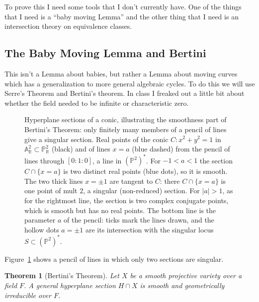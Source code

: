 \documentclass[12pt]{article}
\numberwithin{equation}{section}
\newtheorem{theorem}{Theorem}[subsection]
\theoremstyle{definition}
\theoremstyle{remark}
\newcommand{\RR}{\mathbb{R}}
\newcommand{\PP}{\mathbb{P}}
\renewcommand{\AA}{\mathbb{A}}
\begin{document}
To prove this I need some tools that I don't currently have.
One of the things that I need is a ``baby moving Lemma'' and the other thing that I need is an intersection theory on equivalence classes. 

\subsection{The Baby Moving Lemma and Bertini}
This isn't a Lemma about babies, but rather a Lemma about moving curves which has a generalization to more general algebraic cycles. 
To do this we will use Serre's Theorem and Bertini's theorem. 
In class I freaked out a little bit about whether the field needed to be infinite or characteristic zero. 

\begin{figure}[H]
\centering

\caption{Hyperplane sections of a conic, illustrating the smoothness part of Bertini's Theorem: only finitely many members of a pencil of lines give a singular section. Real points of the conic $C\colon x^2+y^2=1$ in $\AA^2_\RR\subset\PP^2_\RR$ (black) and of lines $x=a$ (blue dashed) from the pencil of lines through $[0:1:0]$, a line in $(\PP^2)^*$. For $-1<a<1$ the section $C\cap\{x=a\}$ is two distinct real points (blue dots), so it is smooth. The two thick lines $x=\pm1$ are tangent to $C$: there $C\cap\{x=a\}$ is one point of mult $2$, a singular (non-reduced) section. For $\vert a\vert>1$, as for the rightmost line, the section is two complex conjugate points, which is smooth but has no real points. The bottom line is the parameter $a$ of the pencil: ticks mark the lines drawn, and the hollow dots $a=\pm1$ are its intersection with the singular locus $S\subset(\PP^2)^*$.}\label{fig:bertini-pencil}
\end{figure}
Figure~\ref{fig:bertini-pencil} shows a pencil of lines in which only two sections are singular.

\begin{theorem}[Bertini's Theorem]
	Let $X$ be a smooth projective variety over a field $F$. 
	A general hyperplane section $H\cap X$ is smooth and geometrically irreducible over $F$. 
\end{theorem}
\end{document}
